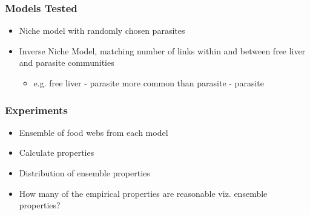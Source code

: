 \documentclass[table]{beamer}
\begin{document}
\begin{frame}
    \frametitle{Models Tested}
    \begin{itemize}[<+->]
        \item Niche model with randomly chosen parasites
        \item Inverse Niche Model, matching number of links within and between
            free liver and parasite communities
            \begin{itemize}
                \item e.g. free liver - parasite more common than parasite -
                    parasite
            \end{itemize}
    \end{itemize}
\end{frame}

\begin{frame}
    \frametitle{Experiments}
    \begin{itemize}[<+->]
        \item Ensemble of food webs from each model
        \item Calculate properties
        \item Distribution of ensemble properties
        \item How many of the empirical properties are reasonable viz. ensemble
            properties?
    \end{itemize}
\end{frame}
\end{document}

